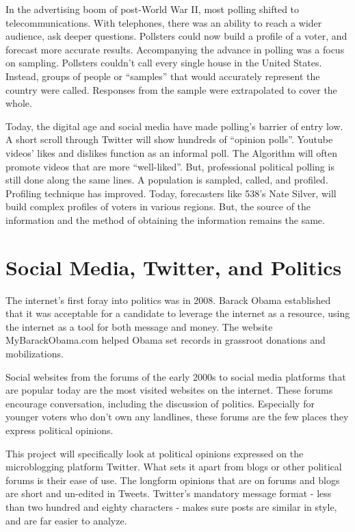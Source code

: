 \documentclass[11pt, twoside, reqno]{book}
\begin{document}
In the advertising boom of post-World War II, most polling shifted to telecommunications. With telephones, there was an ability to reach a wider audience, ask deeper questions. Pollsters could now build a profile of a voter, and forecast more accurate results. Accompanying the advance in polling was a focus on sampling. Pollsters couldn’t call every single house in the United States. Instead, groups of people or “samples” that would accurately represent the country were called. Responses from the sample were extrapolated to cover the whole. 

Today, the digital age and social media have made polling’s barrier of entry low. A short scroll through Twitter will show hundreds of “opinion polls”. Youtube videos’ likes and dislikes function as an informal poll. The Algorithm will often promote videos that are more “well-liked”. But, professional political polling is still done along the same lines. A population is sampled, called, and profiled. Profiling technique has improved. Today, forecasters like 538’s Nate Silver, will build complex profiles of voters in various regions. But, the source of the information and the method of obtaining the information remains the same. 

\section{Social Media, Twitter, and Politics}
\hspace{0.2in}The internet’s first foray into politics was in 2008. Barack Obama established that it was acceptable for a candidate to leverage the internet as a resource, using the internet as a tool for both message and money. The website MyBarackObama.com helped Obama set records in grassroot donations and mobilizations. 

Social websites from the forums of the early 2000s to social media platforms that are popular today are the most visited websites on the internet. These forums encourage conversation, including the discussion of politics. Especially for younger voters who don’t own any landlines, these forums are the few places they express political opinions. 

This project will specifically look at political opinions expressed on the microblogging platform Twitter. What sets it apart from blogs or other political forums is their ease of use. The longform opinions that are on forums and blogs are short and un-edited in Tweets. Twitter’s mandatory message format - less than two hundred and eighty characters - makes sure posts are similar in style, and are far easier to analyze. 
\end{document}

